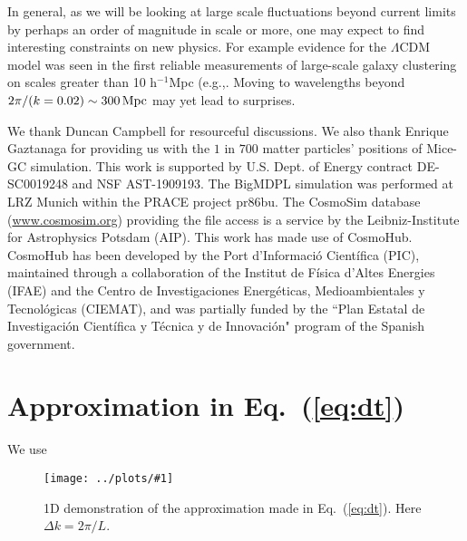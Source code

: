\documentclass[prd,amsmath,amssymb,floatfix,superscriptaddress,nofootinbib,twocolumn]{revtex4-1}
\newcommand{\ec}[1]{Eq.~(\ref{eq:#1})}
\newcommand{\sfig}[2]{
\texttt{[image: ../plots/\#1]}
        }
\newcommand{\Sfig}[2]{
   \begin{figure}[thbp]
   \begin{center}
    \sfig{../plots/#1.pdf}{\columnwidth}
    \caption{{\small #2}}
    \label{fig:#1}
     \end{center}
   \end{figure}
}
\begin{document}
In general, as we will be looking at large scale fluctuations beyond
current limits by perhaps an order of magnitude in scale or more, one may
expect to find interesting constraints on new physics. For example evidence
for the $\Lambda$CDM model was seen in the first reliable measurements
of large-scale galaxy clustering on scales greater than 10 h$^{-1}$Mpc
(e.g.,\cite{https://ui.adsabs.harvard.edu/abs/1990Natur.348..705E/abstract}.
Moving to wavelengths  beyond $2\pi/(k=0.02) \sim 300 \rm \, Mpc$
may yet lead to surprises.

\acknowledgements
We thank Duncan Campbell for resourceful discussions. We also thank Enrique Gaztanaga for providing us with the $1$ in $700$ matter particles' positions of Mice-GC simulation. This work is supported by U.S. Dept. of Energy contract DE-SC0019248 and NSF AST-1909193.
The BigMDPL simulation was performed at LRZ Munich within the PRACE project pr86bu. The CosmoSim database (\url{www.cosmosim.org}) providing the file access is a service by the Leibniz-Institute for Astrophysics Potsdam (AIP).
This work has made use of CosmoHub. CosmoHub has been developed by the Port d'Informació Científica (PIC), maintained through a collaboration of the Institut de Física d'Altes Energies (IFAE) and the Centro de Investigaciones Energéticas, Medioambientales y Tecnológicas (CIEMAT), and was partially funded by the ``Plan Estatal de Investigación Científica y Técnica y de Innovación" program of the Spanish government.
\clearpage

\appendix 

\section{Approximation in \ec{dt}}
We use
\Sfig{approx}{1D demonstration of the approximation made in \ec{dt}. Here $\Delta k=2\pi /L$.}
\end{document}
